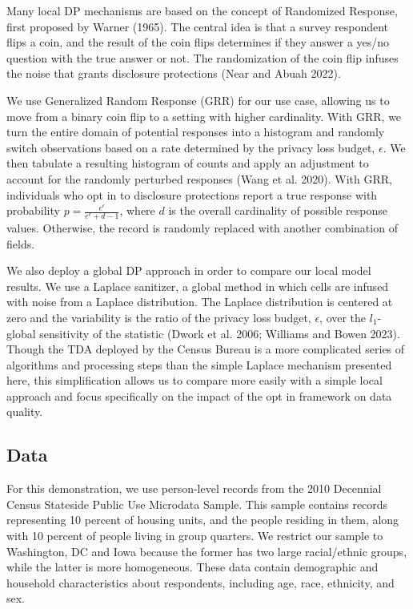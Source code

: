 \documentclass[
]{urban-formatting}
\begin{document}
Many local DP mechanisms are based on the concept of Randomized
Response, first proposed by Warner (1965). The central idea is that a
survey respondent flips a coin, and the result of the coin flips
determines if they answer a yes/no question with the true answer or not.
The randomization of the coin flip infuses the noise that grants
disclosure protections (Near and Abuah 2022).

We use Generalized Random Response (GRR) for our use case, allowing us
to move from a binary coin flip to a setting with higher cardinality.
With GRR, we turn the entire domain of potential responses into a
histogram and randomly switch observations based on a rate determined by
the privacy loss budget, \(\epsilon\). We then tabulate a resulting
histogram of counts and apply an adjustment to account for the randomly
perturbed responses (Wang et al. 2020). With GRR, individuals who opt in
to disclosure protections report a true response with probability
\(p = \frac{e^\epsilon}{e^\epsilon + d - 1}\), where \(d\) is the
overall cardinality of possible response values. Otherwise, the record
is randomly replaced with another combination of fields.

We also deploy a global DP approach in order to compare our local model
results. We use a Laplace sanitizer, a global method in which cells are
infused with noise from a Laplace distribution. The Laplace distribution
is centered at zero and the variability is the ratio of the privacy loss
budget, \(\epsilon\), over the \(l_1\)-global sensitivity of the
statistic (Dwork et al. 2006; Williams and Bowen 2023). Though the TDA
deployed by the Census Bureau is a more complicated series of algorithms
and processing steps than the simple Laplace mechanism presented here,
this simplification allows us to compare more easily with a simple local
approach and focus specifically on the impact of the opt in framework on
data quality.

\subsection{Data}

For this demonstration, we use person-level records from the 2010
Decennial Census Stateside Public Use Microdata Sample. This sample
contains records representing 10 percent of housing units, and the
people residing in them, along with 10 percent of people living in group
quarters. We restrict our sample to Washington, DC and Iowa because the
former has two large racial/ethnic groups, while the latter is more
homogeneous. These data contain demographic and household
characteristics about respondents, including age, race, ethnicity, and
sex.
\end{document}

